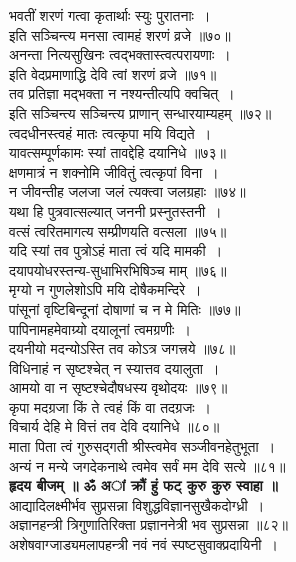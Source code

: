 \documentclass[twoside,top=1.7cm, bottom=1.7cm, outer=1cm,landscape, inner=1.5cm,a5paper,]{book}
\begin{document}
\begin{center}
भवतीं शरणं गत्वा कृतार्थाः स्युः पुरातनाः~।\\
इति सञ्चिन्त्य मनसा त्वामहं शरणं व्रजे ॥७०॥\\[10pt]
अनन्ता नित्यसुखिनः त्वद्भक्तास्त्वत्परायणाः~।\\
इति वेदप्रमाणाद्धि देवि त्वां शरणं व्रजे ॥७१॥\\[10pt]
तव प्रतिज्ञा मद्भक्ता न नश्यन्तीत्यपि क्वचित्~।\\
इति सञ्चिन्त्य सञ्चिन्त्य प्राणान् सन्धारयाम्यहम् ॥७२॥\\[10pt]
\newpage
त्वदधीनस्त्वहं मातः त्वत्कृपा मयि विद्यते~।\\
यावत्सम्पूर्णकामः स्यां तावद्देहि दयानिधे ॥७३॥\\[10pt]
क्षणमात्रं न शक्नोमि जीवितुं त्वत्कृपां विना~।\\
न जीवन्तीह जलजा जलं त्यक्त्वा जलग्रहाः ॥७४॥\\[10pt]
यथा हि पुत्रवात्सल्यात् जननी प्रस्नुतस्तनी~।\\
वत्सं त्वरितमागत्य सम्प्रीणयति वत्सला ॥७५॥\\[10pt]
यदि स्यां तव पुत्रोऽहं माता त्वं यदि मामकी~।\\
दयापयोधरस्तन्य-सुधाभिरभिषिञ्च माम् ॥७६॥\\[10pt]
\newpage
मृग्यो न गुणलेशोऽपि मयि दोषैकमन्दिरे~।\\
पांसूनां वृष्टिबिन्दूनां दोषाणां च न मे मितिः ॥७७॥\\[10pt]
पापिनामहमेवाग्र्यो दयालूनां त्वमग्रणीः~।\\
दयनीयो मदन्योऽस्ति तव कोऽत्र जगत्त्रये ॥७८॥\\[10pt]
विधिनाहं न सृष्टश्चेत् न स्यात्तव दयालुता~।\\
आमयो वा न सृष्टश्चेदौषधस्य वृथोदयः ॥७९॥\\[10pt]
कृपा मदग्रजा किं ते त्वहं किं वा तदग्रजः~।\\
विचार्य देहि मे वित्तं तव देवि दयानिधे ॥८०॥\\[10pt]
\newpage
माता पिता त्वं गुरुसद्गती श्रीस्त्वमेव सञ्जीवनहेतुभूता~।\\
अन्यं न मन्ये जगदेकनाथे त्वमेव सर्वं मम देवि सत्ये ॥८१॥\\[10pt]
{\bfseries हृदय बीजम् ॥ ॐ अां क्रौं हुं फट् कुरु कुरु स्वाहा ॥}\\[10pt]
आद्यादिलक्ष्मीर्भव सुप्रसन्ना विशुद्धविज्ञानसुखैकदोग्ध्री~।\\
अज्ञानहन्त्री त्रिगुणातिरिक्ता प्रज्ञाननेत्री भव सुप्रसन्ना ॥८२॥\\[10pt]
अशेषवाग्जाड्यमलापहन्त्री नवं नवं स्पष्टसुवाक्प्रदायिनी~।\\

\end{center}
\end{document}
